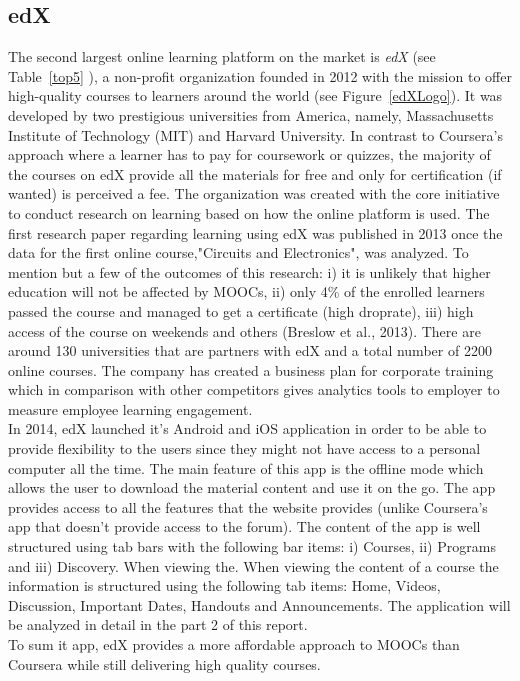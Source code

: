 \documentclass[11]{article}
\begin{document}
	\subsection{edX}
	  The second largest online learning platform on the market is \textit{edX} (see Table~\ref{top5} ), a non-profit organization founded in 2012 with the mission to offer high-quality courses to learners around the world (see Figure~\ref{edXLogo}). It was developed by two prestigious universities from America, namely, Massachusetts Institute of Technology (MIT) and Harvard University. In contrast to Coursera's approach where a learner has to pay for coursework or quizzes, the majority of the courses on edX provide all the materials for free  and only for certification (if wanted) is perceived a fee. The organization was created with the core initiative to conduct research on learning based on how the online platform is used. The first research paper regarding learning using edX was published in 2013 once the data for the first online course,"Circuits and Electronics", was analyzed. To mention but a few of the outcomes of this research: i) it is unlikely that higher education will not be affected by MOOCs, ii) only 4\% of the enrolled learners passed the course and managed to get a certificate (high droprate), iii) high access of the course on weekends and others (Breslow et al., 2013). There are around 130 universities that are partners with edX and a total number of 2200 online courses.  The company has created a business plan for corporate training which in comparison with other competitors  gives analytics tools to employer to measure employee learning engagement.\\
\indent
	In 2014, edX launched it's Android and iOS application in order to be able to provide flexibility to the users since they might not have access to a personal computer all the time. The main feature of this app is the offline mode which allows the user to download the material content and use it on the go. The app provides access to all the features that the website provides (unlike Coursera's app that doesn't provide access to the forum). The content of the app is well structured using tab bars with the following bar items: i) Courses, ii) Programs and iii) Discovery. When viewing the. When viewing the content of a course the information is structured using the following tab items: Home, Videos, Discussion, Important Dates, Handouts and Announcements. The application will be analyzed in detail in the part 2 of this report.\\
\indent
	To sum it app, edX provides a more affordable approach to MOOCs than Coursera while still delivering high quality courses.
\end{document}
